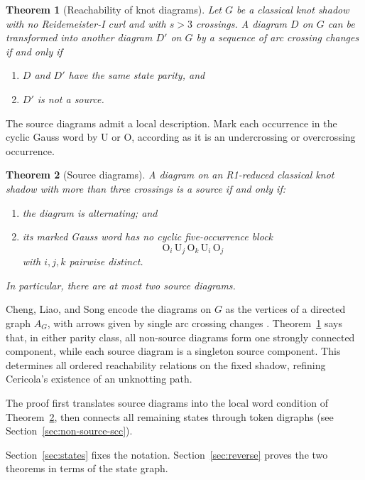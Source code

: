 \documentclass[11pt]{amsart}
\newtheorem{theorem}{Theorem}[section]
\theoremstyle{definition}
\theoremstyle{remark}
\begin{document}
\begin{theorem}[Reachability of knot diagrams]\label{thm:intro-diagrams}
Let \(G\) be a classical knot shadow with no Reidemeister-I curl and with
\(s>3\) crossings.  A diagram \(D\) on \(G\) can be transformed into another
diagram \(D'\) on \(G\) by a sequence of arc crossing changes if and only if
\begin{enumerate}
  \item \(D\) and \(D'\) have the same state parity, and
  \item \(D'\) is not a source.
\end{enumerate}

\end{theorem}

The source diagrams admit a local description.  Mark each occurrence
in the cyclic Gauss word by \(\mathrm U\) or \(\mathrm O\), according as it
is an undercrossing or overcrossing occurrence.

\begin{theorem}[Source diagrams]\label{thm:intro-source}
A diagram on an R1-reduced classical knot shadow with more than three
crossings is a source if and only if:
\begin{enumerate}
  \item the diagram is alternating; and
  \item its marked Gauss word has no cyclic five-occurrence block
  \[
    \mathrm O_i\,\mathrm U_j\,\mathrm O_k\,\mathrm U_i\,\mathrm O_j
  \]
  with \(i,j,k\) pairwise distinct.
\end{enumerate}
In particular, there are at most two source diagrams.
\end{theorem}

Cheng, Liao, and Song encode the diagrams on \(G\) as the vertices of a
directed graph \(A_G\), with arrows given by single arc crossing changes
\cite[Section~4.1]{ChengLiaoSong2025}.  Theorem~\ref{thm:intro-diagrams}
says that, in either parity class, all non-source diagrams form one
strongly connected component, while each source diagram is a singleton
source component.   This
determines all ordered reachability relations on the fixed shadow, refining
Cericola's existence of an unknotting path.

The proof first translates source diagrams into the local word condition
of Theorem~\ref{thm:intro-source}, then connects all remaining states through
token digraphs (see Section~\ref{sec:non-source-scc}). 

Section~\ref{sec:states} fixes the notation. Section~\ref{sec:reverse} proves
the two theorems in terms of the state graph. 
\end{document}
